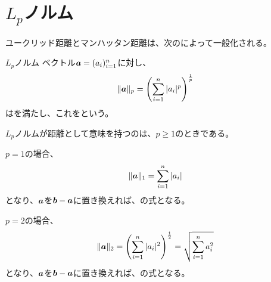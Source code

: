 \documentclass[../../../topic_linear-algebra]{subfiles}
\begin{document}
\sectionline
\section{$L_p$ノルム}

ユークリッド距離とマンハッタン距離は、次のによって一般化される。

\begin{definition*}{$L_p$ノルム}
  ベクトル$\vb*{a} = (a_i)_{i=1}^n$に対し、
  \begin{equation*}
    \|\vb*{a}\|_p = \left( \sum_{i=1}^n |a_i|^p \right)^{\frac{1}{p}}
  \end{equation*}
  はを満たし、これをという。
\end{definition*}

$L_p$ノルムが距離として意味を持つのは、$p \geq 1$のときである。

\br

$p=1$の場合、
\begin{equation*}
  \|\vb*{a}\|_1 = \sum_{i=1}^n |a_i|
\end{equation*}
となり、$\vb*{a}$を$\vb*{b}-\vb*{a}$に置き換えれば、の式となる。

\br

$p=2$の場合、
\begin{equation*}
  \|\vb*{a}\|_2 = \left( \sum_{i=1}^n |a_i|^2 \right)^{\frac{1}{2}} = \sqrt{\sum_{i=1}^n a_i^2}
\end{equation*}
となり、$\vb*{a}$を$\vb*{b}-\vb*{a}$に置き換えれば、の式となる。
\end{document}
